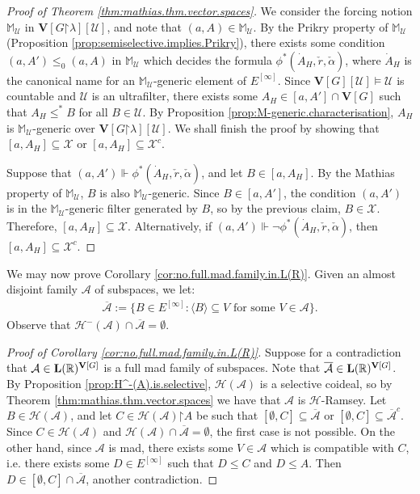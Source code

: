 \documentclass[11pt,reqno]{amsart}
\theoremstyle{plain}
\numberwithin{equation}{section}
\theoremstyle{definition}
\renewcommand{\c}[1]{\langle #1 \rangle}
\newcommand{\R}{\mathbb{R}}
\renewcommand{\bar}[1]{\overline{#1}}
\newcommand{\cal}{\mathcal}
\renewcommand{\bf}{\mathbf}
\newcommand{\A}{\cal{A}}
\newcommand{\forces}{\Vdash}
\newcommand{\restrictedto}{\mathord{\upharpoonright}}
\newcommand{\U}{\cal{U}}
\newcommand{\V}{\bf{V}}
\newcommand{\X}{\cal{X}}
\renewcommand{\H}{\cal{H}}
\let\strokeL\L
\DeclareRobustCommand{\L}{\ifmmode\mathbf{L}\else\strokeL\fi}
\begin{document}
\begin{proof}[Proof of Theorem \ref{thm:mathias.thm.vector.spaces}]
    We consider the forcing notion $\mathbb{M}_\U$ in $\V[G\restrictedto\lambda][\U]$, and note that $(a,A) \in \mathbb{M}_\U$. By the Prikry property of $\mathbb{M}_\U$ (Proposition \ref{prop:semiselective.implies.Prikry}), there exists some condition $(a,A') \leq_0 (a,A)$ in $\mathbb{M}_\U$ which decides the formula $\phi^*(\dot{A}_H,\check{r},\check{\alpha})$, where $\dot{A}_H$ is the canonical name for an $\mathbb{M}_\U$-generic element of $E^{[\infty]}$. Since $\V[G][\U] \models \U$ is countable and $\U$ is an ultrafilter, there exists some $A_H \in [a,A'] \cap \V[G]$ such that $A_H \leq^* B$ for all $B \in \U$. By Proposition \ref{prop:M-generic.characterisation}, $A_H$ is $\mathbb{M}_\U$-generic over $\V[G\restrictedto\lambda][\U]$. We shall finish the proof by showing that $[a,A_H] \subseteq \X$ or $[a,A_H] \subseteq \X^c$.

    Suppose that $(a,A') \forces \phi^*(\dot{A}_H,\check{r},\check{\alpha})$, and let $B \in [a,A_H]$. By the Mathias property of $\mathbb{M}_\U$, $B$ is also $\mathbb{M}_\U$-generic. Since $B \in [a,A']$, the condition $(a,A')$ is in the $\mathbb{M}_\U$-generic filter generated by $B$, so by the previous claim, $B \in \X$. Therefore, $[a,A_H] \subseteq \X$. Alternatively, if $(a,A') \forces \neg\phi^*(\dot{A}_H,\check{r},\check{\alpha})$, then $[a,A_H] \subseteq \X^c$.
\end{proof}

We may now prove Corollary \ref{cor:no.full.mad.family.in.L(R)}. Given an almost disjoint family $\A$ of subspaces, we let:
\begin{align*}
    \bar{\A} := \{B \in E^{[\infty]} : \c{B} \subseteq V \text{ for some } V \in \A\}.
\end{align*}
Observe that $\H^-(\A) \cap \bar{\A} = \emptyset$.

\begin{proof}[Proof of Corollary \ref{cor:no.full.mad.family.in.L(R)}]
    Suppose for a contradiction that $\A \in \L(\R)^{\V[G]}$ is a full mad family of subspaces. Note that $\bar{\A} \in \L(\R)^{\V[G]}$. By Proposition \ref{prop:H^-(A).is.selective}, $\H(\A)$ is a selective coideal, so by Theorem \ref{thm:mathias.thm.vector.spaces} we have that $\A$ is $\H$-Ramsey. Let $B \in \H(\A)$, and let $C \in \H(\A)\restrictedto A$ be such that $[\emptyset,C] \subseteq \bar{\A}$ or $[\emptyset,C] \subseteq \bar{\A}^c$. Since $C \in \H(\A)$ and $\H(\A) \cap \bar{\A} = \emptyset$, the first case is not possible. On the other hand, since $\A$ is mad, there exists some $V \in \A$ which is compatible with $C$, i.e. there exists some $D \in E^{[\infty]}$ such that $D \leq C$ and $D \leq A$. Then $D \in [\emptyset,C] \cap \bar{\A}$, another contradiction.
\end{proof}
\end{document}
